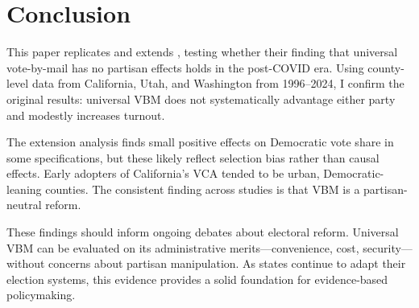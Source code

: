 \documentclass[12pt]{article}
\begin{document}
\section{Conclusion}

This paper replicates and extends \citet{thompson2020universal}, testing whether their finding that universal vote-by-mail has no partisan effects holds in the post-COVID era. Using county-level data from California, Utah, and Washington from 1996--2024, I confirm the original results: universal VBM does not systematically advantage either party and modestly increases turnout.

The extension analysis finds small positive effects on Democratic vote share in some specifications, but these likely reflect selection bias rather than causal effects. Early adopters of California's VCA tended to be urban, Democratic-leaning counties. The consistent finding across studies is that VBM is a partisan-neutral reform.

These findings should inform ongoing debates about electoral reform. Universal VBM can be evaluated on its administrative merits---convenience, cost, security---without concerns about partisan manipulation. As states continue to adapt their election systems, this evidence provides a solid foundation for evidence-based policymaking.
\end{document}
